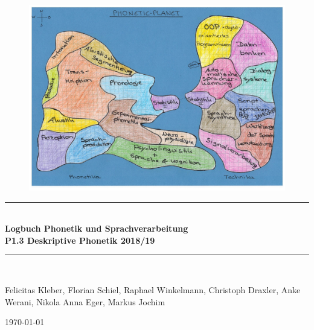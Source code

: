 \documentclass[11pt]{book}
\begin{document}
\begin{titlepage}
\begin{center}
\begin {figure}[t]
\includegraphics[width=1.0\textwidth] {grafiken/titel/landkarte.jpg} \\
\end{figure} 

\newcommand{\HRule}{\rule{\linewidth}{0.5mm}}
\HRule \\[0.3cm]
{ \huge \bfseries Logbuch Phonetik und Sprachverarbeitung}\\
{\bfseries P1.3 Deskriptive Phonetik 2018/19}
\\
\HRule \\[0.5cm]

\begin{minipage}{0.8\textwidth}
\large
Felicitas Kleber, Florian Schiel, Raphael Winkelmann, Christoph Draxler, Anke Werani, Nikola Anna Eger, Markus Jochim

\end{minipage}

{\large \today}\vspace {1cm}


\end{center}
\end{titlepage}
\end{document}
